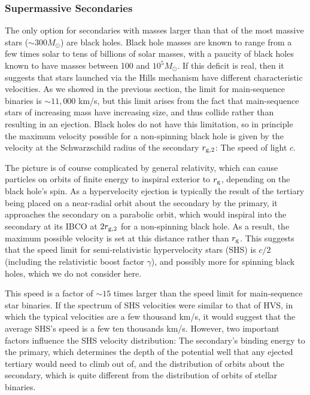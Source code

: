 \documentclass[a4paper,twocolumn]{emulateapj}
\begin{document}
\subsubsection{Supermassive Secondaries}
The only option for secondaries with masses larger than that of the most massive stars ($\sim 300 M_{\odot}$) are black holes. Black hole masses are known to range from a few times solar to tens of billions of solar masses, with a paucity of black holes known to have masses between 100 and $10^{5} M_{\odot}$. If this deficit is real, then it suggests that stars launched via the Hills mechanism have different characteristic velocities. As we showed in the previous section, the limit for main-sequence binaries is $\sim 11,000$ km/s, but this limit arises from the fact that main-sequence stars of increasing mass have increasing size, and thus collide rather than resulting in an ejection. Black holes do not have this limitation, so in principle the maximum velocity possible for a non-spinning black hole is given by the velocity at the Schwarzschild radius of the secondary $r_{\rm g,2}$: The speed of light $c$.

The picture is of course complicated by general relativity, which can cause particles on orbits of finite energy to inspiral exterior to $r_{\rm g}$, depending on the black hole's spin. As a hypervelocity ejection is typically the result of the tertiary being placed on a near-radial orbit about the secondary by the primary, it approaches the secondary on a parabolic orbit, which would inspiral into the secondary at its IBCO at $2 r_{\rm g,2}$ for a non-spinning black hole. As a result, the maximum possible velocity is set at this distance rather than $r_{\rm g}$. This suggests that the speed limit for semi-relativistic hypervelocity stars (SHS) is $c/2$ (including the relativistic boost factor $\gamma$), and possibly more for spinning black holes, which we do not consider here.

This speed is a factor of $\sim 15$ times larger than the speed limit for main-sequence star binaries. If the spectrum of SHS velocities were similar to that of HVS, in which the typical velocities are a few thousand km/s, it would suggest that the average SHS's speed is a few ten thousands km/s. However, two important factors influence the SHS velocity distribution: The secondary's binding energy to the primary, which determines the depth of the potential well that any ejected tertiary would need to climb out of, and the distribution of orbits about the secondary, which is quite different from the distribution of orbits of stellar binaries.
\end{document}

